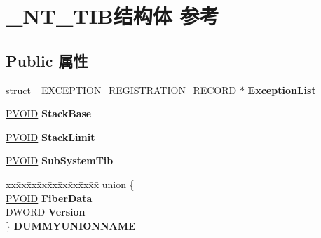 \hypertarget{struct___n_t___t_i_b}{}\section{\+\_\+\+N\+T\+\_\+\+T\+I\+B结构体 参考}
\label{struct___n_t___t_i_b}
\subsection*{Public 属性}
\begin{DoxyCompactItemize}
\item 
\mbox{\label{struct___n_t___t_i_b_af9ad04f9f0a003d51ca37e391019ef22}} 
\hyperlink{interfacestruct}{struct} \hyperlink{struct___e_x_c_e_p_t_i_o_n___r_e_g_i_s_t_r_a_t_i_o_n___r_e_c_o_r_d}{\+\_\+\+E\+X\+C\+E\+P\+T\+I\+O\+N\+\_\+\+R\+E\+G\+I\+S\+T\+R\+A\+T\+I\+O\+N\+\_\+\+R\+E\+C\+O\+RD} $\ast$ {\bfseries Exception\+List}
\item 
\mbox{\label{struct___n_t___t_i_b_acd28900df69034aebe654c5b3434787e}} 
\hyperlink{interfacevoid}{P\+V\+O\+ID} {\bfseries Stack\+Base}
\item 
\mbox{\label{struct___n_t___t_i_b_a71cb36a1033768249e6bb3ee8cdd434b}} 
\hyperlink{interfacevoid}{P\+V\+O\+ID} {\bfseries Stack\+Limit}
\item 
\mbox{\label{struct___n_t___t_i_b_ace201c29a10c6152cf1fcbf1cb6a61bb}} 
\hyperlink{interfacevoid}{P\+V\+O\+ID} {\bfseries Sub\+System\+Tib}
\item 
\mbox{\label{struct___n_t___t_i_b_aa706bd2017753d9b6757ff6d1a2801d8}} 
\begin{tabbing}
xx\=xx\=xx\=xx\=xx\=xx\=xx\=xx\=xx\=\kill
union \{\\
\>\hyperlink{interfacevoid}{PVOID} {\bfseries FiberData}\\
\>DWORD {\bfseries Version}\\
\} {\bfseries DUMMYUNIONNAME}\\


\end{tabbing}
\end{DoxyCompactItemize}
